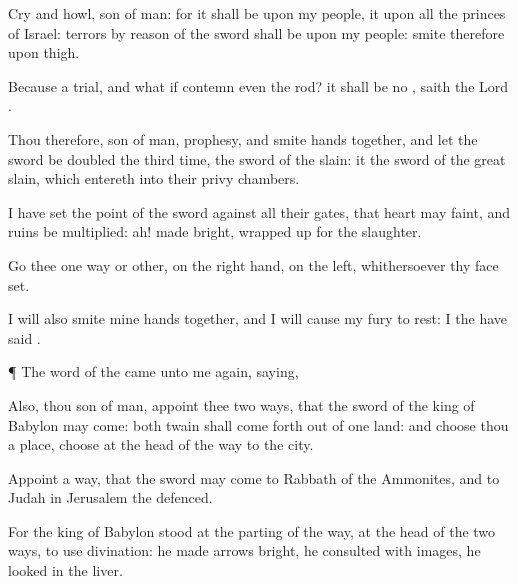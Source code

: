 {Cry and
howl,
son of
man: for it shall be upon my
people, it
{} upon all the
princes of
Israel:
terrors by reason
of the
sword shall be upon my
people:
smite therefore upon
{}
thigh.

Because
{} a
trial, and what if
{}
contemn even the
rod? it shall be no
{},
saith the
Lord
{}.

Thou therefore,
son of
man,
prophesy, and
smite
{}
hands
together, and let the
sword be
doubled the
third time, the
sword of the
slain: it
{} the
sword of the
great
{}
slain, which entereth into their privy
chambers.

I have
set the
point of the
sword against all their
gates, that
{}
heart may
faint, and
{}
ruins be
multiplied:
ah!
{}
made
bright,
{} wrapped
up for the
slaughter.

Go thee one way or
other,
{}
on the right
hand,
{} on the
left,
whithersoever thy
face
{}
set.

I will also
smite mine
hands
together, and I will cause my
fury to
rest: I the
{} have
said
{}.


\par }{\PP {}¶ The
word of the
{} came unto me again,
saying,

Also, thou
son of
man,
appoint thee
two
ways, that the
sword of the
king of
Babylon may
come: both
twain shall come
forth out of
one
land: and
choose thou a
place,
choose
{} at the
head of the
way to the
city.

Appoint a
way, that the
sword may
come to
Rabbath of the
Ammonites, and to
Judah in
Jerusalem the
defenced.

For the
king of
Babylon
stood at the
parting of the
way, at the
head of the
two
ways, to
use
divination: he made
{}
arrows
bright, he
consulted with
images, he
looked in the
liver.

}
